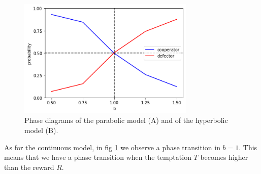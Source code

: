 \begin{figure}
\includegraphics[width=0.75\textwidth]{immagini/discr_phase}\caption{\label{fig:Phase-diagrams}Phase diagrams of the parabolic model (A)
and of the hyperbolic model (B).}
\end{figure}

As for the continuous model, in fig \ref{fig:Phase-diagrams} we observe
a phase transition in $b=1$. This means that we have a phase transition
when the temptation $T$ becomes higher than the reward $R$.
